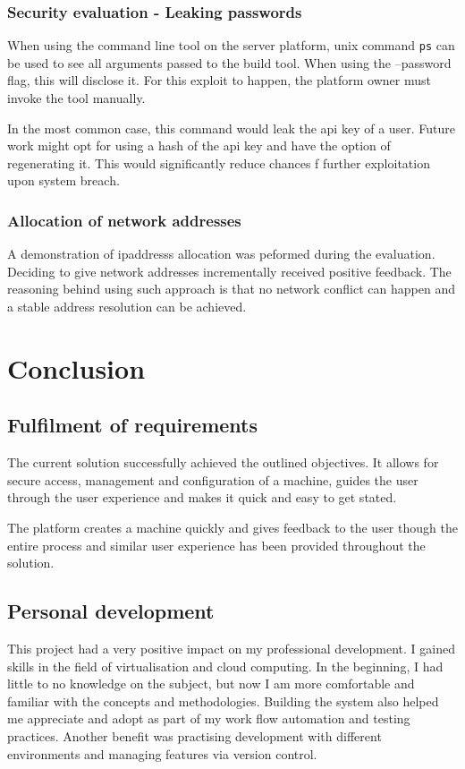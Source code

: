 \documentclass{article}
\begin{document}
\subsubsection{Security evaluation - Leaking passwords}
When using the command line tool on the server platform, \gls{unix} command \texttt{ps} can be used to see all arguments passed to the build tool. When using the --password flag, this will disclose it.
For this exploit to happen, the platform owner must invoke the tool manually.

In the most common case, this command would leak the \gls{api} key of a user. Future work might opt for using a hash of the \gls{api} key and have the option of regenerating it. This would significantly reduce chances f further exploitation upon system breach.

\subsubsection{Allocation of network addresses}
A demonstration of \glspl{ipaddress} allocation was peformed during the evaluation. Deciding to give network addresses incrementally received positive feedback. The reasoning behind using such approach is that no network conflict can happen and a stable address resolution can be achieved.

\newpage
\section{Conclusion}

\subsection{Fulfilment of requirements}
The current solution successfully achieved the outlined objectives. It allows for secure access, management and configuration of a machine, guides the user through the user experience and makes it quick and easy to get stated. 

The platform creates a machine quickly and gives feedback to the user though the entire process and similar user experience has been provided throughout the solution. 

\subsection{Personal development}
This project had a very positive impact on my professional development. I gained skills in the field of virtualisation and cloud computing. In the beginning, I had little to no knowledge on the subject, but now I am more comfortable and familiar with the concepts and methodologies. Building the system also helped me appreciate and adopt as part of my work flow automation and testing practices. Another benefit was practising development with different environments and managing features via version control. 
\end{document}
